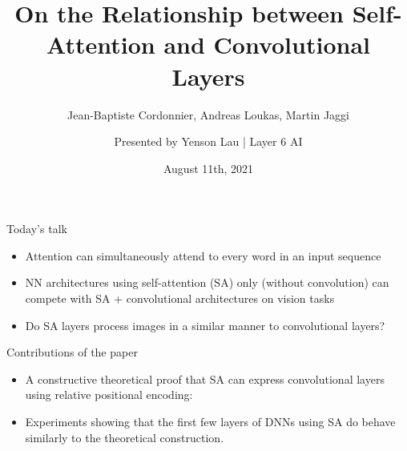 \documentclass[9pt]{beamer}
\title{On the Relationship between Self-Attention and Convolutional Layers}
\subtitle{Jean-Baptiste Cordonnier, Andreas Loukas, Martin Jaggi}
\author{Presented by Yenson Lau | Layer 6 AI}
\date{August 11th, 2021}
\begin{document}
\maketitle


\begin{frame}{Today's talk}
\begin{itemize} \setlength\itemsep{1em}
\item Attention can simultaneously attend to every word in an input sequence
\item NN architectures using self-attention (SA) only (without convolution) can compete with SA + convolutional architectures on vision tasks
\item Do SA layers process images in a similar manner to convolutional layers?
\end{itemize}
\end{frame}


\begin{frame}{Contributions of the paper}
\begin{itemize}
\item A constructive theoretical proof that SA can express convolutional layers using relative positional encoding:
\end{itemize}

\begin{center}
\vspace{.15in}
\noindent{}
\vspace{.2in}
\end{center}

\begin{itemize}
\item Experiments showing that the first few layers of DNNs using SA do behave similarly to the theoretical construction.
\end{itemize}
\end{frame}
\end{document}
